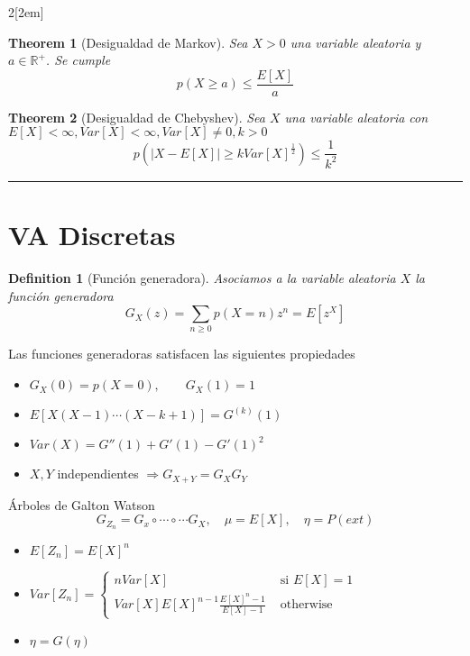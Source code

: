 \documentclass[leqno]{article}
\newtheorem*{theorem}{Theorem}
\newtheorem*{definition}{Definition}
\begin{document}
\begin{multicols}{2}[\columnsep2em]
\begin{theorem}[Desigualdad de Markov]
Sea $X>0$ una variable aleatoria y  $a\in \mathbb{R}^+$. Se cumple
\[
p(X\ge a)\le \frac{E[X]}{a}
\] 
\end{theorem}

\begin{theorem}[Desigualdad de Chebyshev] Sea $X$ una variable aleatoria con  $E[X]<\infty, Var[X]<\infty, Var[X]\neq 0, k>0$
  \[
  p(|X-E[X]|\ge kVar[X]^{\frac{1}{2}})\le \frac{1}{k^2}
  \] 
\end{theorem}

\hrule

\section{VA Discretas}

\begin{definition}[Función generadora] Asociamos a la variable aleatoria $X$ la función generadora
   \[
  G_X(z) = \sum_{n\ge 0} p(X=n)z^n = E[z^X]
  \] 
\end{definition}

Las funciones generadoras satisfacen las siguientes propiedades
\begin{itemize}[topsep=-6pt, itemsep=0pt]
  \item $G_X(0) = p(X=0), \qquad G_X(1) = 1$
  \item $E[X(X-1)\cdots (X-k+1)] =G^{(k)}(1)$ 
  \item $Var(X) = G''(1)+G'(1)-G'(1)^2$ 
  \item $X, Y$ independientes  $\Rightarrow G_{X+Y} = G_XG_Y$
\end{itemize}

Árboles de Galton Watson
\[
G_{Z_n}=G_x \circ \cdots \circ \cdots G_X, \quad \mu = E[X], \quad \eta = P(ext)
\] 
 \begin{itemize}[topsep=-6pt, itemsep=0pt]
  \item $E[Z_n] = E[X]^n$
  \item  $Var[Z_n] = \begin{cases}
	  nVar[X]  & \text{ si } E[X] = 1\\
	  Var[X]E[X]^{n-1} \frac{E[X]^n-1}{E[X]-1} & \text{ otherwise}
  \end{cases}$
  \item $\eta = G(\eta)$ 
\end{itemize}


\end{multicols}

\newpage
\end{document}
